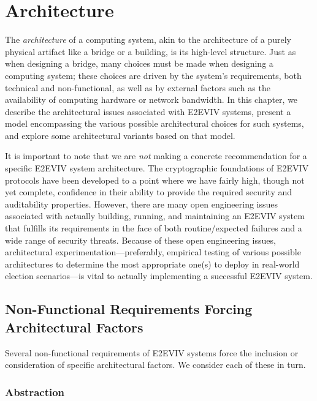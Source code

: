 \chapter{Architecture}
\label{chapter:architecture}

The \emph{architecture} of a computing system, akin to the
architecture of a purely physical artifact like a bridge or a
building, is its high-level structure. Just as when designing a
bridge, many choices must be made when designing a computing system;
these choices are driven by the system's requirements, both technical
and non-functional, as well as by external factors such as the
availability of computing hardware or network bandwidth. In this
chapter, we describe the architectural issues associated with E2EVIV
systems, present a model encompassing the various possible
architectural choices for such systems, and explore some architectural
variants based on that model.

It is important to note that we are \emph{not} making a concrete
recommendation for a specific E2EVIV system architecture. The
cryptographic foundations of E2EVIV protocols have been developed to a
point where we have fairly high, though not yet complete, confidence
in their ability to provide the required security and auditability
properties. However, there are many open engineering issues associated
with actually building, running, and maintaining an E2EVIV system that
fulfills its requirements in the face of both routine/expected
failures and a wide range of security threats. Because of these open
engineering issues, architectural experimentation---preferably,
empirical testing of various possible architectures to determine the
most appropriate one(s) to deploy in real-world election
scenarios---is vital to actually implementing a successful E2EVIV
system.

\section{Non-Functional Requirements Forcing Architectural Factors}

Several non-functional requirements of E2EVIV systems force the
inclusion or consideration of specific architectural factors. We
consider each of these in turn.

\subsection{Abstraction}

